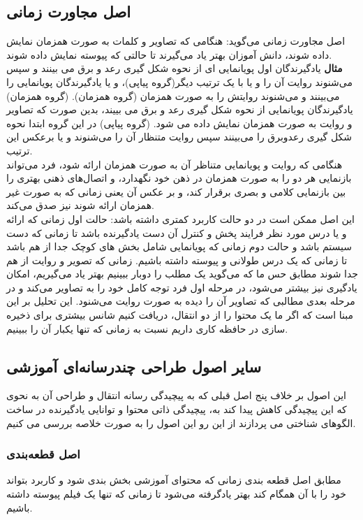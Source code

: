 \subsection{اصل مجاورت زمانی}
اصل مجاورت زمانی
می‌گوید: هنگامی که تصاویر و کلمات به صورت همزمان نمایش داده شوند، دانش آموزان بهتر یاد می‌گیرند تا حالتی که پیوسته نمایش داده شوند.
\\
\textbf{مثال}
یادگیرندگان اول پویانمایی ای از نحوه شکل گیری رعد و برق می بینند و سپس می‌شنوند روایت آن را و یا با یک ترتیب دیگر(گروه پیاپی)، و یا یادگیرندگان پویانمایی را می‌بینند و می‌شنوند روایتش را به صورت همزمان (گروه همزمان).
(گروه همزمان) یادگیرندگان پویانمایی از نحوه شکل گیری رعد و برق می بییند، بدین صورت که تصاویر و روایت به صورت همزمان نمایش داده می شود. (گروه پیاپی) در این گروه ابتدا نحوه شکل گیری رعدوبرق را می‌بینند سپس روایت متنظار آن را می‌شنوند و یا برعکس این ترتیب.
\\
هنگامی که روایت و پویانمایی متناظر آن به صورت همزمان ارائه شود،‌ فرد می‌تواند بازنمایی هر دو را به صورت همزمان در ذهن خود نگهدارد، و اتصال‌های ذهنی بهتری را بین بازنمایی کلامی و بصری برقرار کند، و بر عکس آن یعنی زمانی که به صورت غیر همزمان ارائه شوند نیز صدق می‌کند.
\\
این اصل ممکن است در دو حالت کاربرد کمتری داشته باشد: حالت اول زمانی که ارائه و یا درس مورد نظر فرایند پخش و کنترل آن دست یادگیرنده باشد تا زمانی که دست سیستم باشد و حالت دوم زمانی که پویانمایی شامل بخش های کوچک جدا از هم باشد تا زمانی که یک درس طولانی و پیوسته داشته باشیم. زمانی که تصویر و روایت از هم جدا شوند مطابق حس ما که می‌گوید یک مطلب را دوبار ببینیم بهتر یاد می‌گیریم، امکان یادگیری نیز بیشتر می‌شود، در مرحله اول فرد توجه کامل خود را به تصاویر می‌کند و در مرحله بعدی مطالبی که تصاویر آن را دیده به صورت روایت می‌شنود. این تحلیل بر این مبنا است که اگر ما یک محتوا را از دو انتقال،‌ دریافت کنیم شانس بیشتری برای ذخیره سازی در حافظه کاری داریم نسبت به زمانی که تنها یکبار آن را ببینیم.

\subsection{سایر اصول طراحی چندرسانه‌ای آموزشی}
این اصول بر خلاف پنج اصل قبلی که به پیچیدگی رسانه انتقال و طراحی آن به نحوی که این پیچیدگی کاهش پیدا کند به، پیچیدگی ذاتی محتوا و توانایی یادگیرنده در ساخت الگوهای شناختی می پردازند از این رو این اصول را به صورت خلاصه بررسی می کنیم.
\subsubsection{اصل قطعه‌بندی}
مطابق اصل قطعه بندی
زمانی که محتوای آموزشی بخش بندی شود و کاربرد بتواند خود را با آن همگام کند بهتر یادگرفته می‌شود تا زمانی که تنها یک فیلم پیوسته داشته باشیم.
